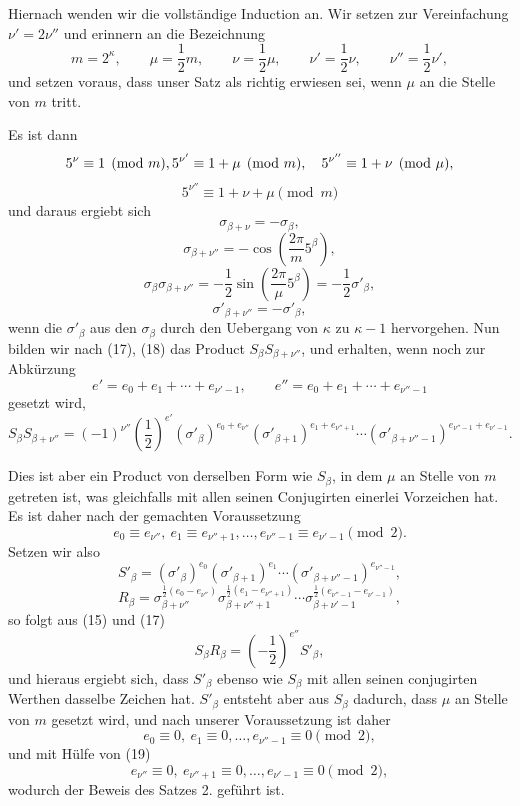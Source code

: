\documentclass[11pt]{article}
\begin{document}
Hiernach wenden wir die vollständige Induction an. Wir setzen zur Vereinfachung $\nu'=2\nu''$ und erinnern an die Bezeichnung
\begin{equation}
m=2^\kappa,\qquad \mu=\frac12m,\qquad \nu=\frac12\mu,
\qquad \nu'=\frac12\nu,
\qquad \nu''=\frac12\nu',
\tag{16}
\end{equation}
und setzen voraus, dass unser Satz als richtig erwiesen sei, wenn $\mu$ an die Stelle von $m$ tritt.

Es ist dann
\[
5^\nu\equiv1\pmod m,\\ 5^{\nu'}\equiv1+\mu\pmod m,
\quad 5^{\nu''}\equiv1+\nu\pmod\mu,
\]
\[
5^{\nu''}\equiv1+\nu+\mu\pmod m
\]
und daraus ergiebt sich
\[
\sigma_{\beta+\nu}=-\sigma_\beta,
\]
\[
\sigma_{\beta+\nu''}=-\cos\left(\frac{2\pi}{m}5^\beta\right),
\]
\begin{equation}
\sigma_\beta\sigma_{\beta+\nu''}=-\frac12\sin\left(\frac{2\pi}{\mu}5^\beta\right)=-\frac12\sigma'_\beta,
\tag{17}
\end{equation}
\begin{equation}
\sigma'_{\beta+\nu''}=-\sigma'_\beta,
\tag{18}
\end{equation}
wenn die $\sigma'_\beta$ aus den $\sigma_\beta$ durch den Uebergang von $\kappa$ zu $\kappa-1$ hervorgehen. Nun bilden wir nach (17), (18) das Product $S_\beta S_{\beta+\nu''}$, und erhalten, wenn noch zur Abkürzung
\[
e'=e_0+e_1+\cdots+e_{\nu'-1},
\qquad e''=e_0+e_1+\cdots+e_{\nu''-1}
\]
gesetzt wird,
\[
S_\beta S_{\beta+\nu''}=(-1)^{\nu''}\left(\frac12\right)^{e'}
(\sigma'_\beta)^{e_0+e_{\nu''}}(\sigma'_{\beta+1})^{e_1+e_{\nu''+1}}\cdots
(\sigma'_{\beta+\nu''-1})^{e_{\nu''-1}+e_{\nu'-1}}.
\]

Dies ist aber ein Product von derselben Form wie $S_\beta$, in dem $\mu$ an Stelle von $m$ getreten ist, was gleichfalls mit allen seinen Conjugirten einerlei Vorzeichen hat. Es ist daher nach der gemachten Voraussetzung
\begin{equation}
e_0\equiv e_{\nu''},\ e_1\equiv e_{\nu''+1},\ldots,e_{\nu''-1}\equiv e_{\nu'-1}\pmod2.
\tag{19}
\end{equation}
Setzen wir also
\[
S'_\beta=(\sigma'_\beta)^{e_0}(\sigma'_{\beta+1})^{e_1}\cdots(\sigma'_{\beta+\nu''-1})^{e_{\nu''-1}},
\]
\[
R_\beta=\sigma_{\beta+\nu''}^{\frac12(e_0-e_{\nu''})}
\sigma_{\beta+\nu''+1}^{\frac12(e_1-e_{\nu''+1})}\cdots
\sigma_{\beta+\nu'-1}^{\frac12(e_{\nu''-1}-e_{\nu'-1})},
\]
so folgt aus (15) und (17)
\[
S_\beta R_\beta=\left(-\frac12\right)^{e''}S'_\beta,
\]
und hieraus ergiebt sich, dass $S'_\beta$ ebenso wie $S_\beta$ mit allen seinen conjugirten Werthen dasselbe Zeichen hat. $S'_\beta$ entsteht aber aus $S_\beta$ dadurch, dass $\mu$ an Stelle von $m$ gesetzt wird, und nach unserer Voraussetzung ist daher
\[
e_0\equiv0,\ e_1\equiv0,\ldots,e_{\nu''-1}\equiv0\pmod2,
\]
und mit Hülfe von (19)
\[
e_{\nu''}\equiv0,\ e_{\nu''+1}\equiv0,\ldots,e_{\nu'-1}\equiv0\pmod2,
\]
wodurch der Beweis des Satzes 2. geführt ist.
\end{document}
